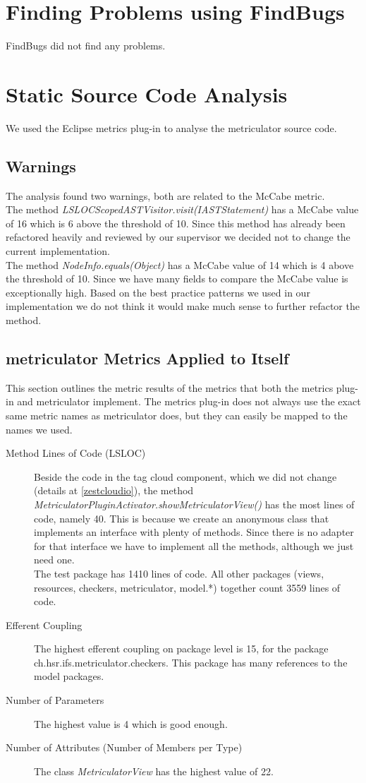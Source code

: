 \documentclass[11pt,a4paper,oneside]{scrreprt}
\begin{document}
\section{Finding Problems using FindBugs}
FindBugs did not find any problems.

\section{Static Source Code Analysis}
We used the Eclipse metrics plug-in  \cite{metrics_plugin} to analyse the metriculator source code. 
\subsection{Warnings}
The analysis found two warnings, both are related to the McCabe metric.\\
The method \textit{LSLOCScopedASTVisitor.visit(IASTStatement)} has a McCabe value of 16 which is 6 above the threshold of 10. Since this method has already been refactored heavily and reviewed by our supervisor we decided not to change the current implementation.\\
The method \textit{NodeInfo.equals(Object)} has a McCabe value of 14 which is 4 above the threshold of 10. Since we have many fields to compare the McCabe value is exceptionally high. Based on the best practice patterns \cite{jiaei_equals} we used in our implementation we do not think it would make much sense to further refactor the method.

\subsection{metriculator Metrics Applied to Itself}
This section outlines the metric results of the metrics that both the metrics plug-in and metriculator implement. The metrics plug-in does not always use the exact same metric names as metriculator does, but they can easily be mapped to the names we used.
\begin{description}
\item[Method Lines of Code (LSLOC)] Beside the code in the tag cloud component, which we did not change (details at \ref{zestcloudio}), the method \textit{MetriculatorPluginActivator.showMetriculatorView()} has the most lines of code, namely 40. This is because we create an anonymous class that implements an interface with plenty of methods. Since there is no adapter for that interface we have to implement all the methods, although we just need one.\\
The test package has 1410 lines of code. All other packages (views, resources, checkers, metriculator, model.*) together count 3559 lines of code.
\item[Efferent Coupling] The highest efferent coupling on package level is 15, for the package ch.hsr.ifs.metriculator.checkers. This package has many references to the model packages.
\item[Number of Parameters] The highest value is 4 which is good enough.
\item[Number of Attributes (Number of Members per Type)] The class \textit{MetriculatorView} has the highest value of 22.
\end{description}
\end{document}
